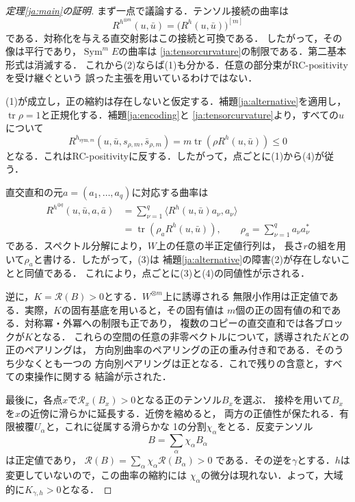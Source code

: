 \documentclass[12pt]{amsart}
\theoremstyle{definition}
\theoremstyle{remark}
\numberwithin{equation}{section}
\DeclareMathOperator{\tr}{tr}
\DeclareMathOperator{\Sym}{Sym}
\theoremstyle{definition}
\begin{document}
\begin{proof}[定理\ref{ja:main}の証明]
まず一点で議論する．テンソル接続の曲率は
\begin{equation}\label{ja:tensorcurvature}
 R^{h^{\otimes m}}(u,\bar u)=\bigl(R^h(u,\bar u)\bigr)^{[m]}
\end{equation}
である．対称化を与える直交射影はこの接続と可換である．
したがって，その像は平行であり，$\Sym^m E$の曲率は
\eqref{ja:tensorcurvature}の制限である．第二基本形式は消滅する．
これから(2)ならば(1)も分かる．任意の部分束がRC-positivityを受け継ぐという
誤った主張を用いているわけではない．

(1)が成立し，正の縮約は存在しないと仮定する．補題\ref{ja:alternative}を適用し，
$\tr\rho=1$と正規化する．補題\ref{ja:encoding}と
\eqref{ja:tensorcurvature}より，すべての$u$について
\[
 R^{h_{\mathrm{sym},m}}(u,\bar u,s_{\rho,m},\bar s_{\rho,m})
 =m\tr(\rho R^h(u,\bar u))\leq0
\]
となる．これはRC-positivityに反する．したがって，点ごとに(1)から(4)が従う．

直交直和の元$a=(a_1,\ldots,a_q)$に対応する曲率は
\begin{equation}\label{ja:sumcurvature}
\begin{aligned}
 R^{h^{\oplus q}}(u,\bar u,a,\bar a)
 &=\sum_{\nu=1}^q\langle R^h(u,\bar u)a_\nu,a_\nu\rangle\\
 &=\tr(\rho_aR^h(u,\bar u)),\qquad
 \rho_a=\sum_{\nu=1}^q a_\nu a_\nu^*
\end{aligned}
\end{equation}
である．スペクトル分解により，$W$上の任意の半正定値行列は，
長さ$r$の組を用いて$\rho_a$と書ける．したがって，(3)は
補題\ref{ja:alternative}の障害(2)が存在しないことと同値である．
これにより，点ごとに(3)と(4)の同値性が示される．

逆に，$K=\mathcal R(B)>0$とする．$W^{\otimes m}$上に誘導される
無限小作用は正定値である．実際，$K$の固有基底を用いると，その固有値は
$m$個の正の固有値の和である．対称冪・外冪への制限も正であり，
複数のコピーの直交直和では各ブロックが$K$となる．
これらの空間の任意の非零ベクトルについて，誘導された$K$との正のペアリングは，
方向別曲率のペアリングの正の重み付き和である．そのうち少なくとも一つの
方向別ペアリングは正となる．これで残りの含意と，すべての束操作に関する
結論が示された．

最後に，各点$x$で$\mathcal R_x(B_x)>0$となる正のテンソル$B_x$を選ぶ．
接枠を用いて$B_x$を$x$の近傍に滑らかに延長する．近傍を縮めると，
両方の正値性が保たれる．有限被覆$U_\alpha$と，これに従属する滑らかな
1の分割$\chi_\alpha$をとる．反変テンソル
\[
 B=\sum_\alpha\chi_\alpha B_\alpha
\]
は正定値であり，
$\mathcal R(B)=\sum_\alpha\chi_\alpha\mathcal R(B_\alpha)>0$
である．その逆を$\gamma$とする．$h$は変更していないので，この曲率の縮約には
$\chi_\alpha$の微分は現れない．よって，大域的に$K_{\gamma,h}>0$となる．
\end{proof}
\end{document}
